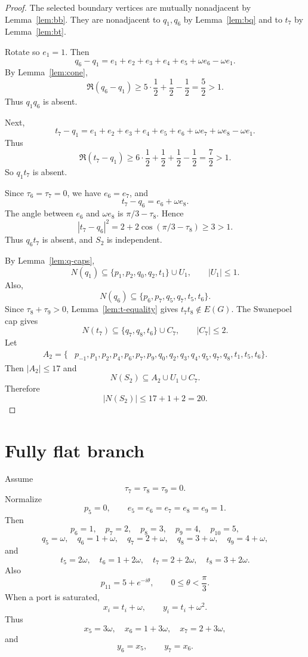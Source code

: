 \documentclass[11pt]{article}
\begin{document}
\begin{proof}
The selected boundary vertices are mutually nonadjacent by Lemma~\ref{lem:bb}. They are nonadjacent to $q_1,q_6$ by Lemma~\ref{lem:bq} and to $t_7$ by Lemma~\ref{lem:bt}.

Rotate so $e_1=1$. Then
\[
 q_6-q_1=e_1+e_2+e_3+e_4+e_5+\omega e_6-\omega e_1.
\]
By Lemma~\ref{lem:cone},
\[
 \Re(q_6-q_1)\ge5\cdot\frac12+\frac12-\frac12=\frac52>1.
\]
Thus $q_1q_6$ is absent.

Next,
\[
 t_7-q_1=e_1+e_2+e_3+e_4+e_5+e_6+\omega e_7+\omega e_8-\omega e_1.
\]
Thus
\[
 \Re(t_7-q_1)\ge6\cdot\frac12+\frac12+\frac12-\frac12=\frac72>1.
\]
So $q_1t_7$ is absent.

Since $\tau_6=\tau_7=0$, we have $e_6=e_7$, and
\[
 t_7-q_6=e_6+\omega e_8.
\]
The angle between $e_6$ and $\omega e_8$ is $\pi/3-\tau_8$. Hence
\[
 |t_7-q_6|^2=2+2\cos(\pi/3-\tau_8)\ge3>1.
\]
Thus $q_6t_7$ is absent, and $S_2$ is independent.

By Lemma~\ref{lem:q-caps},
\[
 N(q_1)\subseteq\{p_1,p_2,q_0,q_2,t_1\}\cup U_1,
 \qquad |U_1|\le1.
\]
Also,
\[
 N(q_6)\subseteq\{p_6,p_7,q_5,q_7,t_5,t_6\}.
\]
Since $\tau_8+\tau_9>0$, Lemma~\ref{lem:t-equality} gives $t_7t_8\notin E(G)$. The Swanepoel cap gives
\[
 N(t_7)\subseteq\{q_7,q_8,t_6\}\cup C_7,
 \qquad |C_7|\le2.
\]
Let
\[
\begin{aligned}
A_2=\{&p_{-1},p_1,p_2,p_4,p_6,p_7,p_9,q_0,q_2,q_3,q_4,q_5,q_7,q_8,t_1,t_5,t_6\}.
\end{aligned}
\]
Then $|A_2|\le17$ and
\[
 N(S_2)\subseteq A_2\cup U_1\cup C_7.
\]
Therefore
\[
 |N(S_2)|\le17+1+2=20.
\]
\end{proof}

\section{Fully flat branch}

Assume
\[
 \tau_7=\tau_8=\tau_9=0.
\]
Normalize
\[
 p_5=0,
 \qquad
 e_5=e_6=e_7=e_8=e_9=1.
\]
Then
\[
 p_6=1,
 \quad p_7=2,
 \quad p_8=3,
 \quad p_9=4,
 \quad p_{10}=5,
\]
\[
 q_5=\omega,
 \quad q_6=1+\omega,
 \quad q_7=2+\omega,
 \quad q_8=3+\omega,
 \quad q_9=4+\omega,
\]
and
\[
 t_5=2\omega,
 \quad t_6=1+2\omega,
 \quad t_7=2+2\omega,
 \quad t_8=3+2\omega.
\]
Also
\[
 p_{11}=5+e^{-i\theta},
 \qquad 0\le\theta<\frac{\pi}{3}.
\]
When a port is saturated,
\[
 x_i=t_i+\omega,
 \qquad y_i=t_i+\omega^2.
\]
Thus
\[
 x_5=3\omega,
 \quad x_6=1+3\omega,
 \quad x_7=2+3\omega,
\]
and
\[
 y_6=x_5,
 \qquad y_7=x_6.
\]
\end{document}
